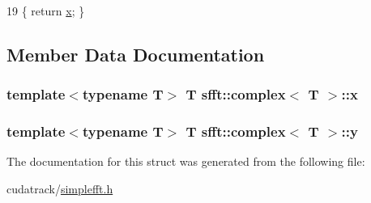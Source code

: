 \begin{DoxyCode}
19 \{ \textcolor{keywordflow}{return} \hyperlink{structsfft_1_1complex_abce667bde1aace2b50483797715d92f5}{x}; \}
\end{DoxyCode}


\subsection{Member Data Documentation}
\subsubsection[{\texorpdfstring{x}{x}}]{\setlength{\rightskip}{0pt plus 5cm}template$<$typename T$>$ T {\bf sfft\+::complex}$<$ T $>$\+::x}\hypertarget{structsfft_1_1complex_abce667bde1aace2b50483797715d92f5}{}\label{structsfft_1_1complex_abce667bde1aace2b50483797715d92f5}
\subsubsection[{\texorpdfstring{y}{y}}]{\setlength{\rightskip}{0pt plus 5cm}template$<$typename T$>$ T {\bf sfft\+::complex}$<$ T $>$\+::y}\hypertarget{structsfft_1_1complex_adf9d36505422dd34ae49c7051d4404ec}{}\label{structsfft_1_1complex_adf9d36505422dd34ae49c7051d4404ec}


The documentation for this struct was generated from the following file\+:\begin{DoxyCompactItemize}
\item 
cudatrack/\hyperlink{simplefft_8h}{simplefft.\+h}\end{DoxyCompactItemize}
